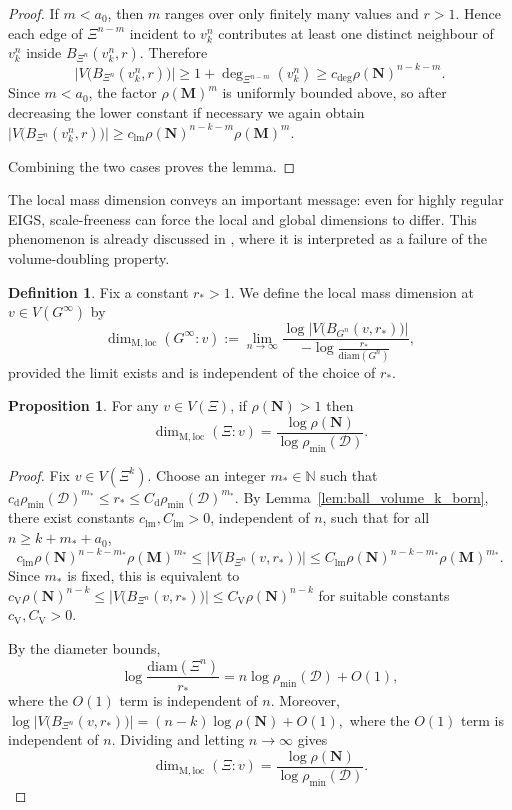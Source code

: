 \documentclass{article}
\theoremstyle{plain}
\theoremstyle{definition}
\newtheorem{definition}[theorem]{Definition}
\newtheorem{proposition}[theorem]{Proposition}
\newcommand{\dist}{\mathrm{d}}
\newcommand{\diam}{\mathrm{diam}}
\begin{document}
\begin{proof}
If $m<a_0$, then $m$ ranges over only finitely many values and $r>1$.
Hence each edge of $\Xi^{n-m}$ incident to $v_k^n$ contributes at least one distinct neighbour of $v_k^n$ inside $B_{\Xi^n}(v_k^n,r)$.
Therefore
\[
\big|V\big(B_{\Xi^n}(v_k^n,r)\big)\big|
\ge
1+\deg_{\Xi^{n-m}}(v_k^n)
\ge
c_{\deg}\rho(\mathbf N)^{n-k-m}.
\]
Since $m<a_0$, the factor $\rho(\mathbf M)^m$ is uniformly bounded above, so after decreasing the lower constant if necessary we again obtain
$
\big|V\big(B_{\Xi^n}(v_k^n,r)\big)\big|
\ge
c_{\mathrm{lm}} \rho(\mathbf N)^{n-k-m} \rho(\mathbf M)^m.
$

Combining the two cases proves the lemma.
\end{proof}

The local mass dimension conveys an important message: even for highly regular EIGS, scale-freeness can force the local and global dimensions to differ.
This phenomenon is already discussed in \cite{hambly2010diffusion}, where it is interpreted as a failure of the volume-doubling property.

\begin{definition}\label{def:local_mass_dimension_constant}
Fix a constant $r_*>1$.
We define the local mass dimension at $v\in V(G^\infty)$ by
\[
\dim_{\mathrm{M,loc}}(G^\infty:v)
:=
\lim_{n\to\infty}
\frac{\log\big|V\big(B_{G^n}(v,r_*)\big)\big|}{-\log \frac{r_*}{\diam(G^n)}},
\]
provided the limit exists and is independent of the choice of $r_*$.
\end{definition}

\begin{proposition}\label{prop:local_mass_dimension_constant}
For any $v\in V(\Xi)$, if $\rho(\mathbf N)>1$ then
\[
\dim_{\mathrm{M,loc}}(\Xi:v)=\frac{\log \rho(\mathbf N)}{\log \rho_{\min}(\mathcal D)}.
\]
\end{proposition}

\begin{proof}
Fix $v\in V(\Xi^k)$.
Choose an integer $m_*\in\mathbb N$ such that
$
c_{\dist}\rho_{\min}(\mathcal D)^{m_*}
\le
r_*
\le
C_{\dist}\rho_{\min}(\mathcal D)^{m_*}.
$
By Lemma~\ref{lem:ball_volume_k_born}, there exist constants $c_{\mathrm{lm}},C_{\mathrm{lm}}>0$, independent of $n$, such that for all $n\ge k+m_*{}+a_0$,
\[
c_{\mathrm{lm}}\rho(\mathbf N)^{n-k-m_*}\rho(\mathbf M)^{m_*}
\le
\big|V\big(B_{\Xi^n}(v,r_*)\big)\big|
\le
C_{\mathrm{lm}}\rho(\mathbf N)^{n-k-m_*}\rho(\mathbf M)^{m_*}.
\]
Since $m_*$ is fixed, this is equivalent to
$
c_{\mathrm V}\rho(\mathbf N)^{n-k}
\le
\big|V\big(B_{\Xi^n}(v,r_*)\big)\big|
\le
C_{\mathrm V}\rho(\mathbf N)^{n-k}
$
for suitable constants $c_{\mathrm V},C_{\mathrm V}>0$.

By the diameter bounds,
\[
\log\frac{\diam(\Xi^n)}{r_*}
=
n\log\rho_{\min}(\mathcal D)+O(1),
\]
where the $O(1)$ term is independent of $n$.
Moreover,
$
\log\big|V\big(B_{\Xi^n}(v,r_*)\big)\big|
=
(n-k)\log\rho(\mathbf N)+O(1),
$
where the $O(1)$ term is independent of $n$.
Dividing and letting $n\to\infty$ gives
\[
\dim_{\mathrm{M,loc}}(\Xi:v)
=
\frac{\log \rho(\mathbf N)}{\log \rho_{\min}(\mathcal D)}.
\]
\end{proof}
\end{document}
